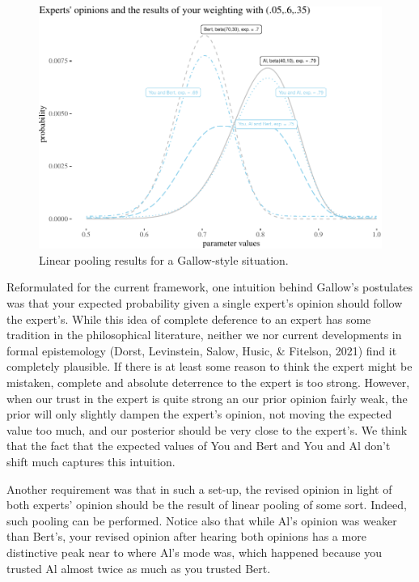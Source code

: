\documentclass[
  10pt,
  dvipsnames,enabledeprecatedfontcommands]{scrartcl}
\begin{document}
\begin{figure}[H]

\begin{center}\includegraphics[width=1\linewidth]{impreciseEpistemicFINAL_files/figure-latex/fig:gallow-1} \end{center}
\caption{Linear pooling results for a Gallow-style situation.}
\label{fig:gallow}
\end{figure}

\noindent Reformulated for the current framework, one intuition behind
Gallow's postulates was that your expected probability given a single
expert's opinion should follow the expert's. While this idea of complete
deference to an expert has some tradition in the philosophical
literature, neither we nor current developments in formal epistemology
(Dorst, Levinstein, Salow, Husic, \& Fitelson, 2021) find it completely
plausible. If there is at least some reason to think the expert might be
mistaken, complete and absolute deterrence to the expert is too strong.
However, when our trust in the expert is quite strong an our prior
opinion fairly weak, the prior will only slightly dampen the expert's
opinion, not moving the expected value too much, and our posterior
should be very close to the expert's. We think that the fact that the
expected values of \textsf{You and Bert} and \textsf{You and Al} don't
shift much captures this intuition.

Another requirement was that in such a set-up, the revised opinion in
light of both experts' opinion should be the result of linear pooling of
some sort. Indeed, such pooling can be performed. Notice also that while
Al's opinion was weaker than Bert's, your revised opinion after hearing
both opinions has a more distinctive peak near to where Al's mode was,
which happened because you trusted Al almost twice as much as you
trusted Bert.
\end{document}
